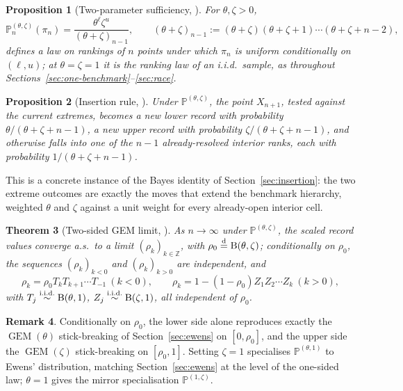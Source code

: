 \documentclass[11pt]{article}
\newcommand{\PP}{\mathbb{P}}
\newcommand{\ZZ}{\mathbb{Z}}
\DeclareMathOperator{\GEM}{GEM}
\theoremstyle{plain}
\newtheorem{theorem}{Theorem}[section]
\newtheorem{proposition}[theorem]{Proposition}
\theoremstyle{definition}
\newtheorem{remark}[theorem]{Remark}
\begin{document}
\begin{proposition}[Two-parameter sufficiency, {\cite[Prop.~2]{GnedinRecords2007}}]
\label{prop:record-family}
For \(\theta,\zeta>0\),
\[
\PP^{(\theta,\zeta)}_n(\pi_n)=\frac{\theta^\ell\zeta^u}{(\theta+\zeta)_{n-1}},\qquad
(\theta+\zeta)_{n-1}:=(\theta+\zeta)(\theta+\zeta+1)\cdots(\theta+\zeta+n-2),
\]
defines a law on rankings of \(n\) points under which \(\pi_n\) is uniform conditionally on \((\ell,u)\); at \(\theta=\zeta=1\) it is the ranking law of an i.i.d.\ sample, as throughout Sections~\ref{sec:one-benchmark}--\ref{sec:race}.
\end{proposition}

\begin{proposition}[Insertion rule, {\cite[eq.~(5)]{GnedinRecords2007}}]
\label{prop:insertion-rule}
Under \(\PP^{(\theta,\zeta)}\), the point \(X_{n+1}\), tested against the current extremes, becomes a new lower record with probability \(\theta/(\theta+\zeta+n-1)\), a new upper record with probability \(\zeta/(\theta+\zeta+n-1)\), and otherwise falls into one of the \(n-1\) already-resolved interior ranks, each with probability \(1/(\theta+\zeta+n-1)\).
\end{proposition}

This is a concrete instance of the Bayes identity of Section~\ref{sec:insertion}: the two extreme outcomes are exactly the moves that extend the benchmark hierarchy, weighted \(\theta\) and \(\zeta\) against a unit weight for every already-open interior cell.

\begin{theorem}[Two-sided GEM limit, {\cite[Prop.~7]{GnedinRecords2007}}]
\label{thm:two-sided-gem}
As \(n\to\infty\) under \(\PP^{(\theta,\zeta)}\), the scaled record values converge a.s.\ to a limit \((\rho_k)_{k\in\ZZ}\), with \(\rho_0\stackrel{\rm d}{=}{\rm B}(\theta,\zeta)\); conditionally on \(\rho_0\), the sequences \((\rho_k)_{k<0}\) and \((\rho_k)_{k>0}\) are independent, and
\[
\rho_k=\rho_0T_kT_{k+1}\cdots T_{-1}\ (k<0),\qquad
\rho_k=1-(1-\rho_0)Z_1Z_2\cdots Z_k\ (k>0),
\]
with \(T_j\stackrel{\text{i.i.d.}}{\sim}{\rm B}(\theta,1)\), \(Z_j\stackrel{\text{i.i.d.}}{\sim}{\rm B}(\zeta,1)\), all independent of \(\rho_0\).
\end{theorem}

\begin{remark}
Conditionally on \(\rho_0\), the lower side alone reproduces exactly the \(\GEM(\theta)\) stick-breaking of Section~\ref{sec:ewens} on \([0,\rho_0]\), and the upper side the \(\GEM(\zeta)\) stick-breaking on \([\rho_0,1]\). Setting \(\zeta=1\) specialises \(\PP^{(\theta,1)}\) to Ewens' distribution, matching Section~\ref{sec:ewens} at the level of the one-sided law; \(\theta=1\) gives the mirror specialisation \(\PP^{(1,\zeta)}\).
\end{remark}
\end{document}
